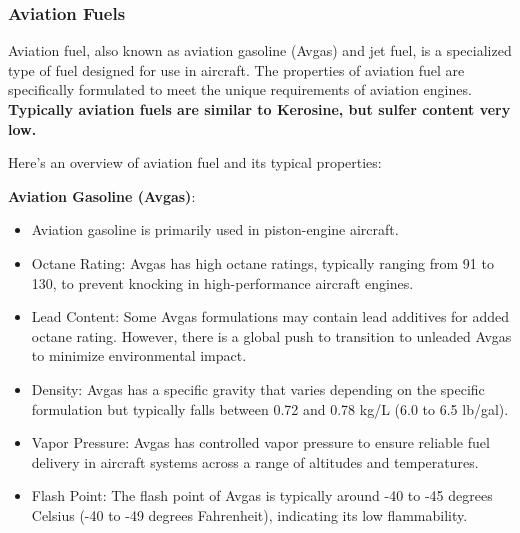 \documentclass{article}
\begin{document}
  \subsubsection*{Aviation Fuels}
  Aviation fuel, also known as aviation gasoline (Avgas) and jet fuel, is a specialized type of fuel designed for use in aircraft. The properties of aviation fuel are specifically formulated to meet the unique requirements of aviation engines. \textbf{Typically aviation fuels are similar to Kerosine, but sulfer content very low.}

  Here's an overview of aviation fuel and its typical properties:

\textbf{Aviation Gasoline (Avgas)}:

\begin{itemize}
  \item Aviation gasoline is primarily used in piston-engine aircraft.
  \item Octane Rating: Avgas has high octane ratings, typically ranging from 91 to 130, to prevent knocking in high-performance aircraft engines.
  \item Lead Content: Some Avgas formulations may contain lead additives for added octane rating. However, there is a global push to transition to unleaded Avgas to minimize environmental impact.
  \item Density: Avgas has a specific gravity that varies depending on the specific formulation but typically falls between 0.72 and 0.78 kg/L (6.0 to 6.5 lb/gal).
  \item Vapor Pressure: Avgas has controlled vapor pressure to ensure reliable fuel delivery in aircraft systems across a range of altitudes and temperatures.
  \item Flash Point: The flash point of Avgas is typically around -40 to -45 degrees Celsius (-40 to -49 degrees Fahrenheit), indicating its low flammability.
\end{itemize}
\end{document}
